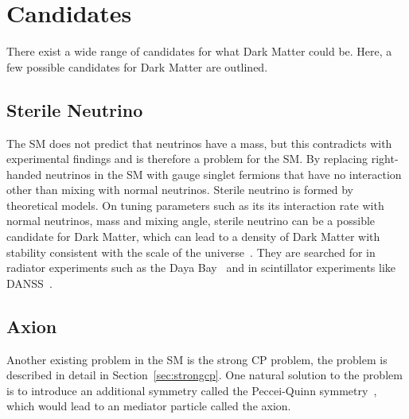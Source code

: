 
\section{Candidates}
\label{section:candidates}
There exist a wide range of candidates for what Dark Matter could be. Here, a few possible candidates for Dark Matter are outlined.

\subsection{Sterile Neutrino}
The SM does not predict that neutrinos have a mass, but this contradicts with experimental findings and is therefore a problem for the SM. By replacing right-handed neutrinos in the SM with gauge singlet fermions that have no interaction other than mixing with normal neutrinos. Sterile neutrino is formed by theoretical models. On tuning parameters such as its its interaction rate with normal neutrinos, mass and mixing angle, sterile neutrino can be a possible candidate for Dark
Matter, which can lead to a density of Dark Matter with stability consistent with the scale of the universe~\cite{dodelson1994sterile}. They are searched for in radiator experiments such as the Daya Bay~\cite{an2014search, wong2017search} and in scintillator experiments like DANSS~\cite{alekseev2018search}.

\subsection{Axion}

Another existing problem in the SM is the strong CP problem, the problem is described in detail in Section~\ref{sec:strongcp}. One natural solution to the problem is to introduce an additional symmetry called the Peccei-Quinn symmetry~\cite{peccei1977cp}, which would lead to an mediator particle called the axion. 

